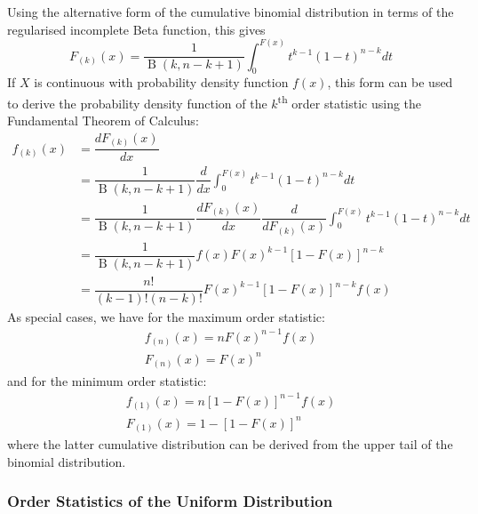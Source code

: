 \documentclass[11pt]{report} %
\begin{document}
Using the alternative form of the cumulative binomial distribution in terms of the regularised incomplete Beta function, this gives
\begin{equation}
F_{\left(k\right)}\left(x\right) = \dfrac{1}{\operatorname{B}\left(k, n - k + 1\right)}\int_{0}^{F\left(x\right)}t^{k - 1}\left(1 - t\right)^{n - k}dt
\end{equation}
If $X$ is continuous with probability density function $f\left(x\right)$, this form can be used to derive the probability density function of the $k$\textsuperscript{th} order statistic using the Fundamental Theorem of Calculus:
\begin{align}
f_{\left(k\right)}\left(x\right) &= \dfrac{dF_{\left(k\right)}\left(x\right)}{dx} \\
&= \dfrac{1}{\operatorname{B}\left(k, n - k + 1\right)}\dfrac{d}{dx}\int_{0}^{F\left(x\right)}t^{k - 1}\left(1 - t\right)^{n - k}dt \\
&= \dfrac{1}{\operatorname{B}\left(k, n - k + 1\right)}\dfrac{dF_{\left(k\right)}\left(x\right)}{dx}\dfrac{d}{dF_{\left(k\right)}\left(x\right)}\int_{0}^{F\left(x\right)}t^{k - 1}\left(1 - t\right)^{n - k}dt \\
&= \dfrac{1}{\operatorname{B}\left(k, n - k + 1\right)}f\left(x\right)F\left(x\right)^{k - 1}\left[1 - F\left(x\right)\right]^{n - k} \\
&= \dfrac{n!}{\left(k - 1\right)!\left(n - k\right)!}F\left(x\right)^{k - 1}\left[1 - F\left(x\right)\right]^{n - k}f\left(x\right)
\end{align}
As special cases, we have for the maximum order statistic:
\begin{gather}
f_{\left(n\right)}\left(x\right) = nF\left(x\right)^{n - 1}f\left(x\right) \\
F_{\left(n\right)}\left(x\right) = F\left(x\right)^{n}
\end{gather}
and for the minimum order statistic:
\begin{gather}
f_{\left(1\right)}\left(x\right) = n\left[1 - F\left(x\right)\right]^{n - 1}f\left(x\right) \\
F_{\left(1\right)}\left(x\right) = 1 - \left[1 - F\left(x\right)\right]^{n}
\end{gather}
where the latter cumulative distribution can be derived from the upper tail of the binomial distribution.

\subsubsection{Order Statistics of the Uniform Distribution}
\end{document}
